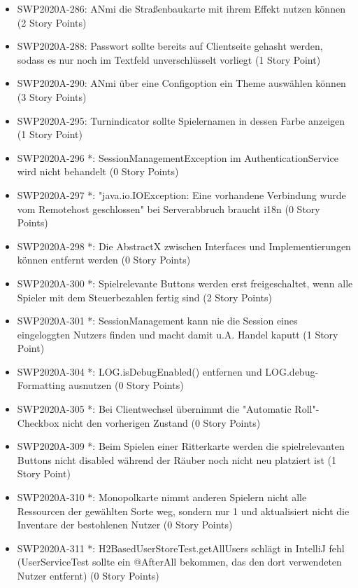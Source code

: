 \documentclass[12pt,a4paper, oneside]{article}
\begin{document}
\begin{itemize}
        \item SWP2020A-286:	ANmi die Straßenbaukarte mit ihrem Effekt nutzen können (2 Story Points)
        \item SWP2020A-288:	Passwort sollte bereits auf Clientseite gehasht werden, sodass es nur noch im Textfeld unverschlüsselt vorliegt (1 Story Point)
        \item SWP2020A-290:	ANmi über eine Configoption ein Theme auswählen können (3 Story Points)
        \item SWP2020A-295:	Turnindicator sollte Spielernamen in dessen Farbe anzeigen (1 Story Point)
        \item SWP2020A-296 *:	SessionManagementException im AuthenticationService wird nicht behandelt (0 Story Points)
        \item SWP2020A-297 *:	"java.io.IOException: Eine vorhandene Verbindung wurde vom Remotehost geschlossen" bei Serverabbruch braucht i18n (0 Story Points)
        \item SWP2020A-298 *:	Die AbstractX zwischen Interfaces und Implementierungen können entfernt werden (0 Story Points)
        \item SWP2020A-300 *:	Spielrelevante Buttons werden erst freigeschaltet, wenn alle Spieler mit dem Steuerbezahlen fertig sind (2 Story Points)
        \item SWP2020A-301 *:	SessionManagement kann nie die Session eines eingeloggten Nutzers finden und macht damit u.A. Handel kaputt  (1 Story Point)
        \item SWP2020A-304 *:	LOG.isDebugEnabled() entfernen und LOG.debug-Formatting ausnutzen (0 Story Points)
        \item SWP2020A-305 *:	Bei Clientwechsel übernimmt die "Automatic Roll"-Checkbox nicht den vorherigen Zustand (0 Story Points)
        \item SWP2020A-309 *:	Beim Spielen einer Ritterkarte werden die spielrelevanten Buttons nicht disabled während der Räuber noch nicht neu platziert ist (1 Story Point)
        \item SWP2020A-310 *:	Monopolkarte nimmt anderen Spielern nicht alle Ressourcen der gewählten Sorte weg, sondern nur 1 und aktualisiert nicht die Inventare der bestohlenen Nutzer (0 Story Points)
        \item SWP2020A-311 *:	H2BasedUserStoreTest.getAllUsers schlägt in IntelliJ fehl (UserServiceTest sollte ein @AfterAll bekommen, das den dort verwendeten Nutzer entfernt) (0 Story Points)
    \end{itemize}
\end{document}
